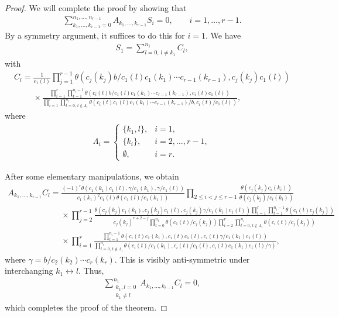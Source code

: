 \documentclass[11pt]{article}
\numberwithin{equation}{section}
\begin{document}
\begin{proof}
We will complete the proof by showing that
\begin{gather*}\sum_{k_1,\dots,k_{r-1}=0}^{n_1,\dots,n_{r-1}}A_{k_1,\dots,k_{r-1}}
S_i=0,\qquad i=1,\dots,r-1.\end{gather*}
 By a symmetry argument, it suffices to do this for $i=1$.
We have
\begin{gather*}S_1=\sum_{l=0,\,l\neq k_1}^{n_1}C_l, \end{gather*}
with
\begin{gather*}
C_l=
\frac{1}{c_1(l)}
\prod\limits_{j=1}^{r-1}\theta(c_j(k_j)b/c_1(l)c_1(k_1)\dotsm
 c_{r-1}(k_{r-1}),
 c_j(k_j)c_1(l))
 \\ \phantom{C_l=}{}
\times\frac{\prod\limits_{i=1}^r\prod\limits_{t=1}^{n_i-1}\theta
(c_i(t)b/c_1(l)c_1(k_1)\dotsm
 c_{r-1}(k_{r-1}),c_i(t)c_1(l))}
{\prod\limits_{i=1}^{r}\prod\limits_{t=0,\,t\notin \Lambda_i}^{n_i}
\theta(c_i(t)c_1(l) c_1(k_1)\dotsm
 c_{r-1}(k_{r-1})/b,c_i(t)/c_1(l))},
\end{gather*}
where
\begin{gather*}
\Lambda_i=
\begin{cases}\{k_1,l\}, & i=1,\\ \{k_i\}, &
 i=2,\dots,r-1,\\ \emptyset, & i=r.
\end{cases}
\end{gather*}

After some elementary manipulations, we obtain
\begin{gather*}
A_{k_1,\dots,k_{r-1}}C_{l}=
\frac{(-1)^r\theta(c_1(k_1)c_1(l),\gamma/c_1(k_1),
\gamma/c_1(l))}{c_1(k_1)^2c_1(l) \theta(c_1(l)/c_1(k_1))}
\prod\limits_{2\leq i<j\leq
 r-1}\frac{\theta(c_j(k_j)c_i(k_i))}{\theta(c_j(k_j)/c_i(k_i))}
 \\ \phantom{A_{k_1,\dots,k_{r-1}}C_{l}=}{}
\times\prod\limits_{j=2}^{r-1}\frac{\theta(c_j(k_j)c_1(k_1),c_j(k_j)c_1(l),c_j(k_j)\gamma/
c_1(k_1)c_1(l))\prod\limits_{i=1}^r\prod\limits_{t=1}^{n_i-1}
\theta(c_i(t)c_j(k_j))}{c_j(k_j)^{r+2-j}
\prod\limits_{t=0}^{n_1}\theta(c_1(t)/c_j(k_j))\prod\limits_{i=2}^{r}\prod\limits_{t=0,\,t\notin
 \Lambda_i}^{n_i}\theta(c_i(t)/c_j(k_j))}
 \\ \phantom{A_{k_1,\dots,k_{r-1}}C_{l}=}{}
\times\prod\limits_{i=1}^r\frac{\prod\limits_{t=1}^{n_i-1}
\theta(c_i(t)c_1(k_1),c_i(t)c_1(l),c_i(t)\gamma/c_1(k_1)c_1(l))}
{\prod\limits_{t=0,\,t\notin \Lambda_i}^{n_i}
\theta(c_i(t)/c_1(k_1),c_i(t)/c_1(l),c_i(t)c_1(k_1)c_1(l)/\gamma)},
\end{gather*}
where $\gamma=b/c_2(k_2)\dotsm c_r(k_r)$.
This is visibly anti-symmetric under interchanging
$k_1\leftrightarrow l$. Thus,
\begin{gather*}
\sum_{\substack{k_1,l=0\\k_1\neq l}}^{n_1}A_{k_1,\dots,k_{r-1}}C_{l}=0,
\end{gather*}
which completes the proof of the theorem.
\end{proof}
\end{document}
